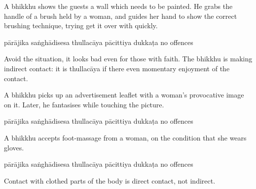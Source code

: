 \begin{exam}{\autoExamName}
\begin{problem*}
\begin{parts}
    \bigskip

  \item A bhikkhu shows the guests a wall which needs to be painted. He grabs the
  handle of a brush held by a woman, and guides her hand to show the correct
  brushing technique, trying get it over with quickly.

  \bigskip

  \begin{answers}{6}
    \bChoices
     pārājika\eAns
     saṅghādisesa\eAns
     thullacāya\eAns
     pācittiya\eAns
     dukkaṭa\eAns
     no offences\eAns
    \eChoices
  \end{answers}

  \begin{solution}
    Avoid the situation, it looks bad even for those with faith. The bhikkhu is
    making indirect contact: it is thullacāya if there even momentary enjoyment
    of the contact.
  \end{solution}

  \bigskip

  \item A bhikkhu picks up an advertisement leaflet with a woman's provocative
    image on it. Later, he fantasises while touching the picture.

  \bigskip

  \begin{answers}{6}
    \bChoices
     pārājika\eAns
     saṅghādisesa\eAns
     thullacāya\eAns
     pācittiya\eAns
     dukkaṭa\eAns
     no offences\eAns
    \eChoices
  \end{answers}

  \bigskip

  \item A bhikkhu accepts foot-massage from a woman, on the condition that she wears gloves.

  \bigskip

  \begin{answers}{6}
    \bChoices
     pārājika\eAns
     saṅghādisesa\eAns
     thullacāya\eAns
     pācittiya\eAns
     dukkaṭa\eAns
     no offences\eAns
    \eChoices
  \end{answers}

  \begin{solution}
    Contact with clothed parts of the body is direct contact, not indirect.
  \end{solution}

  \bigskip


\end{parts}
\end{problem*}
\end{exam}

